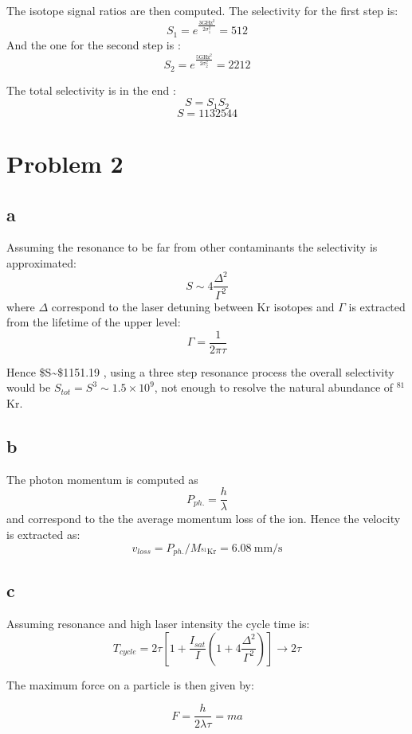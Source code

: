 \documentclass[
  a4paperpaper,
]{article}
\begin{document}
The isotope signal ratios are then computed. The selectivity for the
first step is: \[
    S_1=e^{\frac{3\text{GHz}^2}{2\sigma_1^2}}=512
\] And the one for the second step is : \[
    S_2=e^{\frac{5\text{GHz}^2}{2\sigma_2^2}}=2212
\]

The total selectivity is in the end : \[
    S=S_1S_2
\] \[
\boxed{S=1132544}
\]

\hypertarget{problem-2}{%
\section{Problem 2}\label{problem-2}}

\hypertarget{a-1}{%
\subsection{a}\label{a-1}}

Assuming the resonance to be far from other contaminants the selectivity
is approximated: \[
    S\sim4\dfrac{\Delta^2}{\Gamma^2}
\] where \(\Delta\) correspond to the laser detuning between Kr isotopes
and \(\Gamma\) is extracted from the lifetime of the upper level: \[
    \Gamma=\dfrac{1}{2 \pi \tau}
\]

Hence \$S\sim\$1151.19 , using a three step resonance process the
overall selectivity would be \(S_{tot}=S^3\sim1.5\times10^9\), not
enough to resolve the natural abundance of \(^{81}\)Kr.

\hypertarget{b}{%
\subsection{b}\label{b}}

The photon momentum is computed as \[
    P_{ph.}=\dfrac{h}{\lambda}
\] and correspond to the the average momentum loss of the ion. Hence the
velocity is extracted as: \[
    v_{loss}=P_{ph.}/M_{^{81}\text{Kr}}=6.08\ \text{mm/s}
\]

\hypertarget{c}{%
\subsection{c}\label{c}}

Assuming resonance and high laser intensity the cycle time is: \[
T_{cycle} = 2\tau \left[ 1+\dfrac{I_{sat}}{I}\left( 1+4\dfrac{\Delta ^2}{\Gamma^2}\right)\right] \rightarrow 2\tau
\]

The maximum force on a particle is then given by:

\[
F=\dfrac{h}{2 \lambda \tau} = ma
\]
\end{document}
